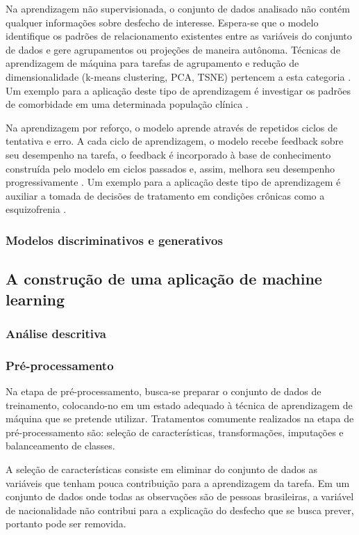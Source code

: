 Na aprendizagem não supervisionada, o conjunto de dados analisado não contém qualquer informações sobre desfecho de interesse. Espera-se que o modelo
identifique os padrões de relacionamento existentes entre as variáveis do conjunto de dados e gere agrupamentos ou projeções de maneira autônoma.
Técnicas de aprendizagem de máquina para tarefas de agrupamento e redução de dimensionalidade (k-means clustering, PCA, TSNE) pertencem a esta categoria
\cite{Theobald2021, Bi2019}. Um exemplo para a aplicação deste tipo de aprendizagem é investigar os padrões de comorbidade em uma determinada população
clínica \cite{Sanchez2019}.

Na aprendizagem por reforço, o modelo aprende através de repetidos ciclos de tentativa e erro. A cada ciclo de aprendizagem, o modelo recebe feedback sobre seu
desempenho na tarefa, o feedback é incorporado à base de conhecimento construída pelo modelo em ciclos passados e, assim, melhora seu desempenho progressivamente
\cite{Theobald2021, Bi2019}. Um exemplo para a aplicação deste tipo de aprendizagem é auxiliar a tomada de decisões de tratamento em condições crônicas como a
esquizofrenia \cite{Shortreed2010}.

\subsubsection{Modelos discriminativos e generativos}

\subsection{A construção de uma aplicação de machine learning}
\subsubsection{Análise descritiva}
\subsubsection{Pré-processamento}
Na etapa de pré-processamento, busca-se preparar o conjunto de dados de treinamento, colocando-no em um estado adequado à técnica
de aprendizagem de máquina que se pretende utilizar. Tratamentos comumente realizados na etapa de pré-processamento são: seleção de
características, transformações, imputações e balanceamento de classes.

A seleção de características consiste em eliminar do conjunto de dados as variáveis que tenham pouca contribuição para a aprendizagem da tarefa.
Em um conjunto de dados onde todas as observações são de pessoas brasileiras, a variável de nacionalidade não contribui para a explicação do desfecho
que se busca prever, portanto pode ser removida.

